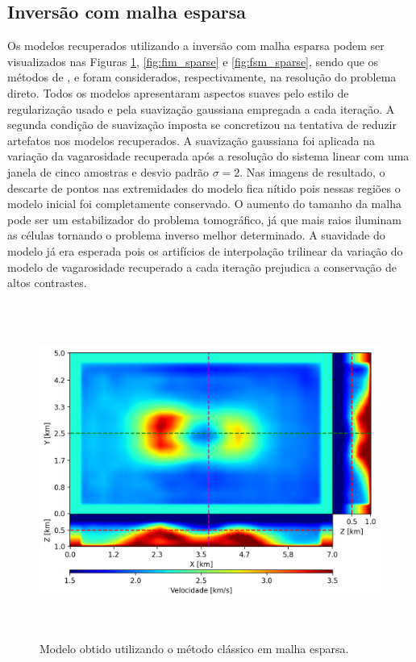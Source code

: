 \subsection{Inversão com malha esparsa}

Os modelos recuperados utilizando a inversão com malha esparsa podem ser visualizados nas Figuras \ref{fig:pod_sparse}, \ref{fig:fim_sparse} e \ref{fig:fsm_sparse}, sendo que os métodos de ,  e  foram considerados, respectivamente, na resolução do problema direto. Todos os modelos apresentaram aspectos suaves pelo estilo de regularização usado e pela suavização gaussiana empregada a cada iteração. A segunda condição de suavização imposta se concretizou na tentativa de reduzir artefatos nos modelos recuperados. A suavização gaussiana foi aplicada na variação da vagarosidade recuperada após a resolução do sistema linear com uma janela de cinco amostras e desvio padrão $\sigma = 2$. Nas imagens de resultado, o descarte de pontos nas extremidades do modelo fica nítido pois nessas regiões o modelo inicial foi completamente conservado. O aumento do tamanho da malha pode ser um estabilizador do problema tomográfico, já que mais raios iluminam as células tornando o problema inverso melhor determinado. A suavidade do modelo já era esperada pois os artifícios de interpolação trilinear da variação do modelo de vagarosidade recuperado a cada iteração prejudica a conservação de altos contrastes. 

\begin{figure}[H]
	\centering
	\includegraphics[width=16cm,height=11cm]{Imgs/Resultados/pod_sparse.png}
	\caption{Modelo obtido utilizando o método clássico em malha esparsa.}
	\label{fig:pod_sparse}	
\end{figure}

